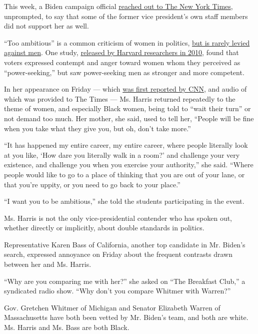 This week, a Biden campaign official
\href{https://www.nytimes.com/2020/07/31/us/politics/joseph-biden-vice-president.html}{reached
out to The New York Times}, unprompted, to say that some of the former
vice president's own staff members did not support her as well.

``Too ambitious'' is a common criticism of women in politics,
\href{https://www.nytimes.com/2019/02/11/us/politics/sexism-double-standard-2020.html}{but
is rarely levied against men}. One study,
\href{https://gap.hks.harvard.edu/price-power-power-seeking-and-backlash-against-female-politicians}{released
by Harvard researchers in 2010}, found that voters expressed contempt
and anger toward women whom they perceived as ``power-seeking,'' but saw
power-seeking men as stronger and more competent.

In her appearance on Friday --- which
\href{https://www.cnn.com/2020/07/31/politics/kamala-harris-ambition-remarks/index.html}{was
first reported by CNN}, and audio of which was provided to The Times ---
Ms. Harris returned repeatedly to the theme of women, and especially
Black women, being told to ``wait their turn'' or not demand too much.
Her mother, she said, used to tell her, ``People will be fine when you
take what they give you, but oh, don't take more.''

``It has happened my entire career, my entire career, where people
literally look at you like, `How dare you literally walk in a room?' and
challenge your very existence, and challenge you when you exercise your
authority,'' she said. ``Where people would like to go to a place of
thinking that you are out of your lane, or that you're uppity, or you
need to go back to your place.''

``I want you to be ambitious,'' she told the students participating in
the event.

Ms. Harris is not the only vice-presidential contender who has spoken
out, whether directly or implicitly, about double standards in politics.

Representative Karen Bass of California, another top candidate in Mr.
Biden's search, expressed annoyance on Friday about the frequent
contrasts drawn between her and Ms. Harris.

``Why are you comparing me with her?'' she asked on ``The Breakfast
Club,'' a syndicated radio show. ``Why don't you compare Whitmer with
Warren?''

Gov. Gretchen Whitmer of Michigan and Senator Elizabeth Warren of
Massachusetts have both been vetted by Mr. Biden's team, and both are
white. Ms. Harris and Ms. Bass are both Black.

